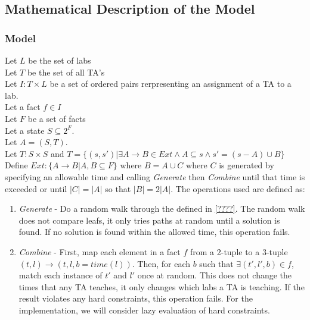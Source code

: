 \documentclass{article}
\begin{document}
\subsection{Mathematical Description of the Model}

\subsubsection{Model}

Let $L$ be the set of labs\\

Let $T$ be the set of all TA's\\

Let $I : T \times L$ be a set of ordered pairs rerpresenting an
assignment of a TA to a lab.\\

Let a fact $f \in I$\\

Let $F$ be a set of facts\\

Let a state $S \subseteq 2^F$.\\

Let $A = (S, T)$.\\

Let $T: S \times S$ and $T = \{ (s,s')| \exists A \to B \in Ext \land A
\subseteq s \land s' =(s-A) \cup B \}$ \\


Define $Ext : \lbrace A \to B | A,B \subseteq F \rbrace$ where $B = A
\cup C$ where $C$ is generated by specifying an allowable time and
calling \textit{Generate} then \textit{Combine} until that time is
exceeded or until $|C| = |A|$ so that $|B| = 2|A|$. The operations
used are defined as:

\begin{enumerate}

\item \textit{Generate} - Do a random walk through the defined in
  \ref{????}. The random walk does not compare leafs, it only tries
  paths at random until a solution is found. If no solution is found
  within the allowed time, this operation fails.

\item \textit{Combine} - First, map each element in a fact $f$ from a
  2-tuple to a 3-tuple $(t, l) \to (t, l, b = time(l))$. Then, for
  each $b$ such that $\exists (t',l',b) \in f$, match each instance of
  $t'$ and $l'$ once at random. This does not change the times that
  any TA teaches, it only changes which labs a TA is teaching. If the
  result violates any hard constraints, this operation fails. For the
  implementation, we will consider lazy evaluation of hard
  constraints.
\end{enumerate}
\end{document}
